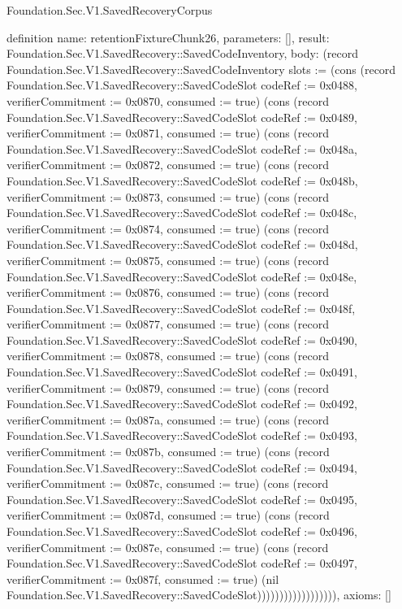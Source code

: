 \begin{lexlean}{Foundation.Sec.V1.SavedRecoveryCorpus}
\begin{semanticmodule}
definition{
  name: retentionFixtureChunk26,
  parameters: [],
  result: Foundation.Sec.V1.SavedRecovery::SavedCodeInventory,
  body: (record Foundation.Sec.V1.SavedRecovery::SavedCodeInventory {slots := (cons (record Foundation.Sec.V1.SavedRecovery::SavedCodeSlot {codeRef := 0x0488, verifierCommitment := 0x0870, consumed := true}) (cons (record Foundation.Sec.V1.SavedRecovery::SavedCodeSlot {codeRef := 0x0489, verifierCommitment := 0x0871, consumed := true}) (cons (record Foundation.Sec.V1.SavedRecovery::SavedCodeSlot {codeRef := 0x048a, verifierCommitment := 0x0872, consumed := true}) (cons (record Foundation.Sec.V1.SavedRecovery::SavedCodeSlot {codeRef := 0x048b, verifierCommitment := 0x0873, consumed := true}) (cons (record Foundation.Sec.V1.SavedRecovery::SavedCodeSlot {codeRef := 0x048c, verifierCommitment := 0x0874, consumed := true}) (cons (record Foundation.Sec.V1.SavedRecovery::SavedCodeSlot {codeRef := 0x048d, verifierCommitment := 0x0875, consumed := true}) (cons (record Foundation.Sec.V1.SavedRecovery::SavedCodeSlot {codeRef := 0x048e, verifierCommitment := 0x0876, consumed := true}) (cons (record Foundation.Sec.V1.SavedRecovery::SavedCodeSlot {codeRef := 0x048f, verifierCommitment := 0x0877, consumed := true}) (cons (record Foundation.Sec.V1.SavedRecovery::SavedCodeSlot {codeRef := 0x0490, verifierCommitment := 0x0878, consumed := true}) (cons (record Foundation.Sec.V1.SavedRecovery::SavedCodeSlot {codeRef := 0x0491, verifierCommitment := 0x0879, consumed := true}) (cons (record Foundation.Sec.V1.SavedRecovery::SavedCodeSlot {codeRef := 0x0492, verifierCommitment := 0x087a, consumed := true}) (cons (record Foundation.Sec.V1.SavedRecovery::SavedCodeSlot {codeRef := 0x0493, verifierCommitment := 0x087b, consumed := true}) (cons (record Foundation.Sec.V1.SavedRecovery::SavedCodeSlot {codeRef := 0x0494, verifierCommitment := 0x087c, consumed := true}) (cons (record Foundation.Sec.V1.SavedRecovery::SavedCodeSlot {codeRef := 0x0495, verifierCommitment := 0x087d, consumed := true}) (cons (record Foundation.Sec.V1.SavedRecovery::SavedCodeSlot {codeRef := 0x0496, verifierCommitment := 0x087e, consumed := true}) (cons (record Foundation.Sec.V1.SavedRecovery::SavedCodeSlot {codeRef := 0x0497, verifierCommitment := 0x087f, consumed := true}) (nil Foundation.Sec.V1.SavedRecovery::SavedCodeSlot)))))))))))))))))}),
  axioms: []
}


\end{semanticmodule}
\end{lexlean}

